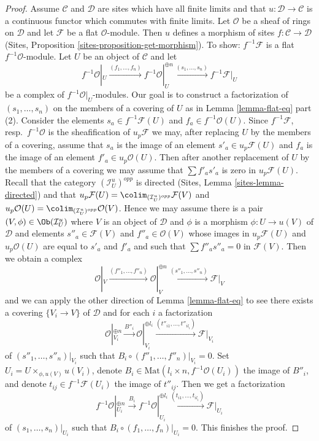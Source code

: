 \begin{proof}
\medskip\noindent
Assume $\mathcal{C}$ and $\mathcal{D}$ are sites which
have all finite limits and that $u : \mathcal{D} \to \mathcal{C}$
is a continuous functor which commutes with finite limits.
Let $\mathcal{O}$ be a sheaf of rings on $\mathcal{D}$
and let $\mathcal{F}$ be a flat $\mathcal{O}$-module.
Then $u$ defines a morphism of sites $f : \mathcal{C} \to \mathcal{D}$
(Sites, Proposition \ref{sites-proposition-get-morphism}).
To show: $f^{-1}\mathcal{F}$ is a flat $f^{-1}\mathcal{O}$-module.
Let $U$ be an object of $\mathcal{C}$ and let
$$
f^{-1}\mathcal{O}|_U \xrightarrow{(f_1, \ldots, f_n)}
f^{-1}\mathcal{O}|_U^{\oplus n} \xrightarrow{(s_1, \ldots, s_n)}
f^{-1}\mathcal{F}|_U
$$
be a complex of $f^{-1}\mathcal{O}|_U$-modules.
Our goal is to construct a factorization of
$(s_1, \ldots, s_n)$ on the members of a covering of $U$
as in Lemma \ref{lemma-flat-eq} part (2).
Consider the elements $s_a \in f^{-1}\mathcal{F}(U)$
and $f_a \in f^{-1}\mathcal{O}(U)$.
Since $f^{-1}\mathcal{F}$, resp.\ $f^{-1}\mathcal{O}$
is the sheafification of $u_p\mathcal{F}$ we may,
after replacing $U$ by the members of a covering,
assume that $s_a$ is the image of an element $s'_a \in u_p\mathcal{F}(U)$ and
$f_a$ is the image of an element $f'_a \in u_p\mathcal{O}(U)$.
Then after another replacement of $U$ by the members of a covering
we may assume that $\sum f'_as'_a$ is zero in $u_p\mathcal{F}(U)$.
Recall that the category $(\mathcal{I}_U^u)^{opp}$ is directed
(Sites, Lemma \ref{sites-lemma-directed})
and that $u_p\mathcal{F}(U) = \colim_{(\mathcal{I}_U^u)^{opp}} \mathcal{F}(V)$
and $u_p\mathcal{O}(U) = \colim_{(\mathcal{I}_U^u)^{opp}} \mathcal{O}(V)$.
Hence we may assume there is a pair $(V, \phi) \in \Ob(\mathcal{I}_U^u)$
where $V$ is an object of $\mathcal{D}$
and $\phi$ is a morphism $\phi : U \to u(V)$ of $\mathcal{D}$
and elements $s''_a \in \mathcal{F}(V)$ and $f''_a \in \mathcal{O}(V)$
whose images in $u_p\mathcal{F}(U)$ and $u_p\mathcal{O}(U)$
are equal to $s'_a$ and $f'_a$ and such that
$\sum f''_a s''_a = 0$ in $\mathcal{F}(V)$.
Then we obtain a complex
$$
\mathcal{O}|_V \xrightarrow{(f''_1, \ldots, f''_n)}
\mathcal{O}|_V^{\oplus n} \xrightarrow{(s''_1, \ldots, s''_n)}
\mathcal{F}|_V
$$
and we can apply the other direction of Lemma \ref{lemma-flat-eq}
to see there exists a covering $\{V_i \to V\}$ of $\mathcal{D}$
and for each $i$ a factorization
$$
\mathcal{O}|_{V_i}^{\oplus n}
\xrightarrow{B''_i}
\mathcal{O}|_{V_i}^{\oplus l_i} \xrightarrow{(t''_{i1}, \ldots, t''_{il_i})}
\mathcal{F}|_{V_i}
$$
of $(s''_1, \ldots, s''_n)|_{V_i}$ such that
$B_i \circ (f''_1, \ldots, f''_n)|_{V_i} = 0$.
Set $U_i = U \times_{\phi, u(V)} u(V_i)$, denote
$B_i \in \text{Mat}(l_i \times n, f^{-1}\mathcal{O}(U_i))$
the image of $B''_i$, and denote
$t_{ij} \in f^{-1}\mathcal{F}(U_i)$ the image of
$t''_{ij}$. Then we get a factorization
$$
f^{-1}\mathcal{O}|_{U_i}^{\oplus n}
\xrightarrow{B_i}
f^{-1}\mathcal{O}|_{U_i}^{\oplus l_i}
\xrightarrow{(t_{i1}, \ldots, t_{il_i})}
\mathcal{F}|_{U_i}
$$
of $(s_1, \ldots, s_n)|_{U_i}$ such that
$B_i \circ (f_1, \ldots, f_n)|_{U_i} = 0$.
This finishes the proof.
\end{proof}


